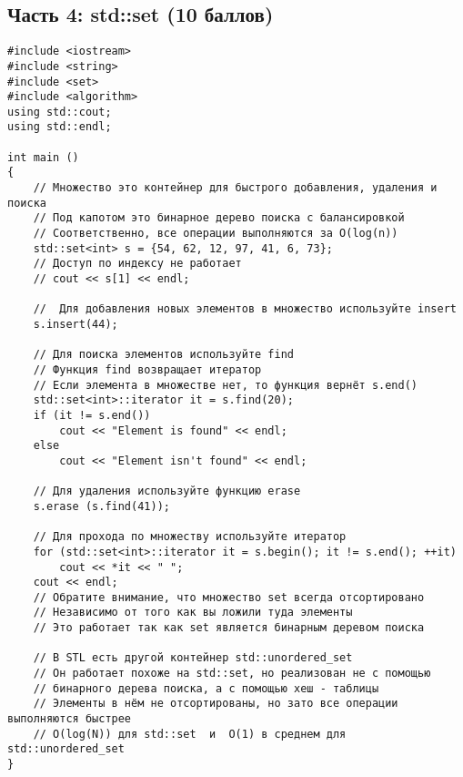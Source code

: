 \documentclass{article}
\begin{document}
\newpage
\subsection*{Часть 4: std::set (10 баллов)}
\begin{lstlisting}
#include <iostream>
#include <string>
#include <set>
#include <algorithm>
using std::cout;
using std::endl;

int main () 
{
    // Множество это контейнер для быстрого добавления, удаления и поиска
    // Под капотом это бинарное дерево поиска с балансировкой
    // Соответственно, все операции выполняются за O(log(n))
    std::set<int> s = {54, 62, 12, 97, 41, 6, 73};
    // Доступ по индексу не работает
    // cout << s[1] << endl;
    
    //  Для добавления новых элементов в множество используйте insert
    s.insert(44);
    
    // Для поиска элементов используйте find
    // Функция find возвращает итератор
    // Если элемента в множестве нет, то функция вернёт s.end()
    std::set<int>::iterator it = s.find(20);
    if (it != s.end())
        cout << "Element is found" << endl;
    else
        cout << "Element isn't found" << endl;
		
    // Для удаления используйте функцию erase
    s.erase (s.find(41));

    // Для прохода по множеству используйте итератор
    for (std::set<int>::iterator it = s.begin(); it != s.end(); ++it)
        cout << *it << " ";
    cout << endl;
    // Обратите внимание, что множество set всегда отсортировано
    // Независимо от того как вы ложили туда элементы
    // Это работает так как set является бинарным деревом поиска
    
    // В STL есть другой контейнер std::unordered_set
    // Он работает похоже на std::set, но реализован не с помощью
    // бинарного дерева поиска, а с помощью хеш - таблицы
    // Элементы в нём не отсортированы, но зато все операции выполняются быстрее
    // O(log(N)) для std::set  и  O(1) в среднем для std::unordered_set
}
\end{lstlisting}
\end{document}
